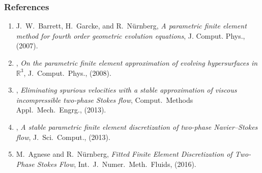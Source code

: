 \documentclass{beamer}
\def\black{\color{black}}
\def\blue{\color{blue}}
\begin{document}
\begin{frame}
\frametitle{References}

\begin{enumerate}
\item
{\sc J.~W.~Barrett, H.~Garcke, and R.~N\"urnberg}, {\em A parametric finite
element method for fourth order geometric evolution equations},
\blue J. Comput. Phys., \black (2007).

\item
\leavevmode\vrule height 2pt depth -1.6pt width 23pt,
{\em On the parametric finite element approximation of evolving hypersurfaces
in {${\mathbb R}^3$}},
\blue J.\ Comput.\ Phys., \black (2008).

\item
\leavevmode\vrule height 2pt depth -1.6pt width 23pt,
{\em Eliminating spurious velocities with a stable approximation of
viscous incompressible two-phase {S}tokes flow},
\blue Comput.\ Methods Appl.\ Mech.\ Engrg., \black (2013).

\item
\leavevmode\vrule height 2pt depth -1.6pt width 23pt,
{\em A stable parametric finite element discretization of two-phase
{N}avier--{S}tokes flow}, \blue J.\ Sci.\ Comput., \black (2013).

\item
{\sc M.~Agnese and R.~N\"urnberg}, {\em Fitted Finite Element Discretization of
Two-Phase {S}tokes Flow}, \blue Int.\ J.\ Numer.\ Meth.\ Fluids, \black (2016).
\end{enumerate}
\end{frame}
\end{document}
